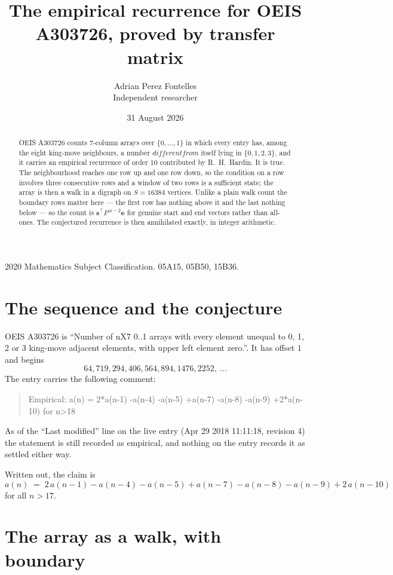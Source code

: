 \documentclass[11pt,a4paper]{article}
\title{The empirical recurrence for OEIS A303726, proved by transfer matrix}
\author{Adrian Perez Fontelles\\ \small Independent researcher}
\date{31 August 2026}
\theoremstyle{plain}
\theoremstyle{definition}
\begin{document}
\maketitle

\begin{abstract}
OEIS A303726 counts $7$-column arrays over $\{0,\dots,1\}$ in which every entry has,
among the eight king-move neighbours, a number $different from$ itself lying in $\{0,1,2,3\}$, and it carries an empirical
recurrence of order $10$ contributed by R.~H.~Hardin. It is true. The neighbourhood
reaches one row up and one row down, so the condition on a row involves three consecutive
rows and a window of two rows is a sufficient state; the array is then a walk in a digraph
on $S=16384$ vertices. Unlike a plain walk count the boundary rows matter here --- the first
row has nothing above it and the last nothing below --- so the count is
$\mathbf{s}^{\!\top}P^{\,n-2}\mathbf{e}$ for genuine start and end vectors rather than
all-ones. The conjectured recurrence is then annihilated exactly, in integer arithmetic.
\end{abstract}

\noindent\small 2020 Mathematics Subject Classification. 05A15, 05B50, 15B36.\normalsize

\section{The sequence and the conjecture}

OEIS A303726 is ``Number of nX7 0..1 arrays with every element unequal to 0, 1, 2 or 3 king-move adjacent elements, with upper left element zero.''. It has offset
$1$ and begins
\[
64, 719, 294, 406, 564, 894, 1476, 2252,\ \dots
\]
The entry carries the following comment:
\begin{quote}\small
Empirical: a(n) = 2*a(n-1) -a(n-4) -a(n-5) +a(n-7) -a(n-8) -a(n-9) +2*a(n-10) for n>18
\end{quote}
As of the ``Last modified'' line on the live entry (Apr 29 2018 11:11:18, revision
4) the statement is still recorded as empirical, and nothing on the entry
records it as settled either way.

Written out, the claim is
\begin{equation}\label{eq:conj}
a(n)\;=\;2\,a(n-1) - a(n-4) - a(n-5) + a(n-7) - a(n-8) - a(n-9) + 2\,a(n-10)
\end{equation}
for all $n>17$.

\section{The array as a walk, with boundary}
\end{document}
